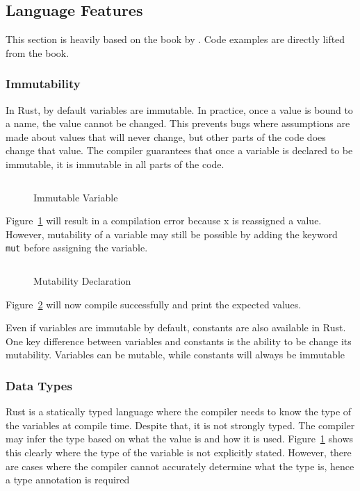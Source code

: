 \documentclass{article}
\newcommand{\rust}[1]{\inputminted{rust}{samples/rust/#1.rs}}
\newcommand{\rustin}[1]{\texttt{#1}}
\begin{document}
  \subsection{Language Features}

  This section is heavily based on the book  by
  \cite{klabnik_nichols_2018}. Code examples are directly lifted from the book.

  \subsubsection{Immutability}
  In Rust, by default variables are immutable. In practice, once a value is
  bound to a name, the value cannot be changed. This prevents bugs where
  assumptions are made about values that will never change, but other parts of
  the code does change that value. The compiler guarantees that once a variable
  is declared to be immutable, it is immutable in all parts of the code.

  \begin{figure}[ht]
    \rust{immutability}
    \caption{Immutable Variable}
    \label{fig:immut}
  \end{figure}

  Figure~\ref{fig:immut} will result in a compilation error because x is
  reassigned a value. However, mutability of a variable may still be possible by
  adding the keyword \rustin{mut} before assigning the variable.

  \begin{figure}[ht]
    \rust{mutability}
    \caption{Mutability Declaration}
    \label{fig:mut}
  \end{figure}

  Figure~\ref{fig:mut} will now compile successfully and print the expected
  values.

  Even if variables are immutable by default, constants are also available in
  Rust. One key difference between variables and constants is the ability to be
  change its mutability. Variables can be mutable, while constants will always
  be immutable

  \subsubsection{Data Types}
  Rust is a statically typed language where the compiler needs to know the type
  of the variables at compile time. Despite that, it is not strongly typed. The
  compiler may infer the type based on what the value is and how it is used.
  Figure~\ref{fig:immut} shows this clearly where the type of the variable is
  not explicitly stated. However, there are cases where the compiler cannot
  accurately determine what the type is, hence a type annotation is required
\end{document}
